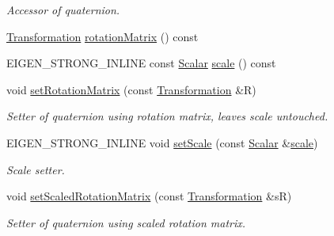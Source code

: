 \begin{DoxyCompactItemize}
\begin{DoxyCompactList}\small\item\em Accessor of quaternion. \end{DoxyCompactList}\item 
\hyperlink{class_sophus_1_1_rx_s_o3_group_base_a60b2d8cd20692d3d39e5e7c729d95145}{Transformation} \hyperlink{class_sophus_1_1_rx_s_o3_group_base_a18c5fc6302987791964ba51371efa6be}{rotation\+Matrix} () const 
\item 
E\+I\+G\+E\+N\+\_\+\+S\+T\+R\+O\+N\+G\+\_\+\+I\+N\+L\+I\+NE const \hyperlink{class_sophus_1_1_rx_s_o3_group_base_af4006e7d95216a7e50823a1cd9c9e265}{Scalar} \hyperlink{class_sophus_1_1_rx_s_o3_group_base_a568f5cbdc1a40cd0f6237a91da65cf4a}{scale} () const 
\item 
void \hyperlink{class_sophus_1_1_rx_s_o3_group_base_a657f576a0239d2ce6aba46f48d904c1f}{set\+Rotation\+Matrix} (const \hyperlink{class_sophus_1_1_rx_s_o3_group_base_a60b2d8cd20692d3d39e5e7c729d95145}{Transformation} \&R)
\begin{DoxyCompactList}\small\item\em Setter of quaternion using rotation matrix, leaves scale untouched. \end{DoxyCompactList}\item 
E\+I\+G\+E\+N\+\_\+\+S\+T\+R\+O\+N\+G\+\_\+\+I\+N\+L\+I\+NE void \hyperlink{class_sophus_1_1_rx_s_o3_group_base_aa0481ad33d7fd4f8698c05bbfc62422e}{set\+Scale} (const \hyperlink{class_sophus_1_1_rx_s_o3_group_base_af4006e7d95216a7e50823a1cd9c9e265}{Scalar} \&\hyperlink{class_sophus_1_1_rx_s_o3_group_base_a568f5cbdc1a40cd0f6237a91da65cf4a}{scale})\hypertarget{class_sophus_1_1_rx_s_o3_group_base_aa0481ad33d7fd4f8698c05bbfc62422e}{}\label{class_sophus_1_1_rx_s_o3_group_base_aa0481ad33d7fd4f8698c05bbfc62422e}

\begin{DoxyCompactList}\small\item\em Scale setter. \end{DoxyCompactList}\item 
void \hyperlink{class_sophus_1_1_rx_s_o3_group_base_ae05c6ad0bd43144e8446b103bfcdbbfd}{set\+Scaled\+Rotation\+Matrix} (const \hyperlink{class_sophus_1_1_rx_s_o3_group_base_a60b2d8cd20692d3d39e5e7c729d95145}{Transformation} \&sR)
\begin{DoxyCompactList}\small\item\em Setter of quaternion using scaled rotation matrix. \end{DoxyCompactList}\end{DoxyCompactItemize}
